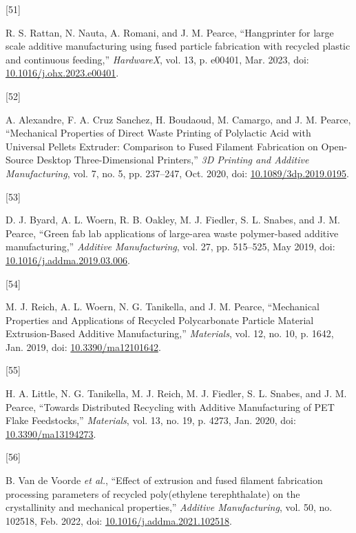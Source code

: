 \documentclass[
]{article}
\newlength{\cslhangindent}
\newlength{\csllabelwidth}
\newlength{\cslentryspacingunit} %
\newenvironment{CSLReferences}[2] %
 {%
  \setlength{\parindent}{0pt}
  \ifodd #1
  \let\oldpar\par
  \def\par{\hangindent=\cslhangindent\oldpar}
  \fi
  \setlength{\parskip}{#2\cslentryspacingunit}
 }%
 {}
\newcommand{\CSLLeftMargin}[1]{\parbox[t]{\csllabelwidth}{#1}}
\newcommand{\CSLRightInline}[1]{\parbox[t]{\linewidth - \csllabelwidth}{#1}\break}
\begin{document}
\begin{CSLReferences}{0}{0}
\leavevmode{}%
\CSLLeftMargin{{[}51{]} }%
\CSLRightInline{R. S. Rattan, N. Nauta, A. Romani, and J. M. Pearce,
{``Hangprinter for large scale additive manufacturing using fused
particle fabrication with recycled plastic and continuous feeding,''}
\emph{HardwareX}, vol. 13, p. e00401, Mar. 2023, doi:
\href{https://doi.org/10.1016/j.ohx.2023.e00401}{10.1016/j.ohx.2023.e00401}.}

\leavevmode{}%
\CSLLeftMargin{{[}52{]} }%
\CSLRightInline{A. Alexandre, F. A. Cruz Sanchez, H. Boudaoud, M.
Camargo, and J. M. Pearce, {``Mechanical {Properties} of {Direct Waste
Printing} of {Polylactic Acid} with {Universal Pellets Extruder}:
{Comparison} to {Fused Filament Fabrication} on {Open-Source Desktop
Three-Dimensional Printers},''} \emph{3D Printing and Additive
Manufacturing}, vol. 7, no. 5, pp. 237--247, Oct. 2020, doi:
\href{https://doi.org/10.1089/3dp.2019.0195}{10.1089/3dp.2019.0195}.}

\leavevmode{}%
\CSLLeftMargin{{[}53{]} }%
\CSLRightInline{D. J. Byard, A. L. Woern, R. B. Oakley, M. J. Fiedler,
S. L. Snabes, and J. M. Pearce, {``Green fab lab applications of
large-area waste polymer-based additive manufacturing,''} \emph{Additive
Manufacturing}, vol. 27, pp. 515--525, May 2019, doi:
\href{https://doi.org/10.1016/j.addma.2019.03.006}{10.1016/j.addma.2019.03.006}.}

\leavevmode{}%
\CSLLeftMargin{{[}54{]} }%
\CSLRightInline{M. J. Reich, A. L. Woern, N. G. Tanikella, and J. M.
Pearce, {``Mechanical {Properties} and {Applications} of {Recycled
Polycarbonate Particle Material Extrusion-Based Additive
Manufacturing},''} \emph{Materials}, vol. 12, no. 10, p. 1642, Jan.
2019, doi:
\href{https://doi.org/10.3390/ma12101642}{10.3390/ma12101642}.}

\leavevmode{}%
\CSLLeftMargin{{[}55{]} }%
\CSLRightInline{H. A. Little, N. G. Tanikella, M. J. Reich, M. J.
Fiedler, S. L. Snabes, and J. M. Pearce, {``Towards {Distributed
Recycling} with {Additive Manufacturing} of {PET Flake Feedstocks},''}
\emph{Materials}, vol. 13, no. 19, p. 4273, Jan. 2020, doi:
\href{https://doi.org/10.3390/ma13194273}{10.3390/ma13194273}.}

\leavevmode{}%
\CSLLeftMargin{{[}56{]} }%
\CSLRightInline{B. Van de Voorde \emph{et al.}, {``Effect of extrusion
and fused filament fabrication processing parameters of recycled
poly(ethylene terephthalate) on the crystallinity and mechanical
properties,''} \emph{Additive Manufacturing}, vol. 50, no. 102518, Feb.
2022, doi:
\href{https://doi.org/10.1016/j.addma.2021.102518}{10.1016/j.addma.2021.102518}.}


\end{CSLReferences}
\end{document}
